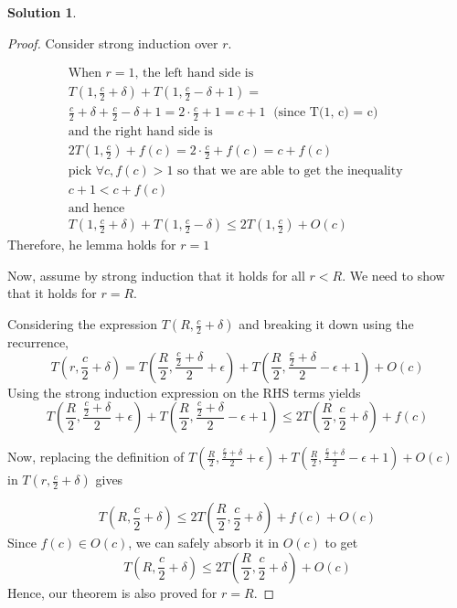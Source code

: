 \documentclass[12pt]{article}
\theoremstyle{definition}
\newtheorem*{solution}{Solution}
\begin{document}
\begin{solution}
\begin{proof}
Consider strong induction over $r$.


\begin{gather*}
\text{When $r = 1$, the left hand side is } \\
T \left(1, \frac{c}{2} + \delta\right) + T \left(1, \frac{c}{2} - \delta + 1 \right) =  \\
\frac{c}{2} + \delta + \frac{c}{2} - \delta + 1= 2 \cdot \frac{c}{2} + 1= c + 1 \; \text{ (since T(1, c) = c)} \\
\text{and the right hand side is} \\
2T \left(1, \frac{c}{2} \right) + f(c) = 2 \cdot \frac c 2 + f(c) = c + f(c) \\
\text{pick $\forall c, f(c) > 1$ so that we are able to get the inequality } \\
c + 1 < c + f(c) \\
\text{and hence} \\
T \left(1, \frac{c}{2} + \delta\right) + T \left(1, \frac{c}{2} - \delta \right) \leq 2T \left(1, \frac{c}{2} \right) + O(c)
\end{gather*}
Therefore, he lemma holds for $r = 1$


Now, assume by strong induction that it holds for all $r < R$. We need to show that it holds for $r = R$.

Considering the expression $T \left(R, \frac{c}{2} + \delta \right)$ and breaking it down using the recurrence, 
$$
T \left(r, \frac{c}{2} + \delta \right) = T\left(\frac{R}{2}, \frac{\frac{c}{2} + \delta}{2} + \epsilon \right) + T\left(\frac{R}{2}, \frac{\frac{c}{2} + \delta}{2} - \epsilon + 1 \right) + O(c)
$$
Using the strong induction expression on the RHS terms yields
\[
T\left(\frac{R}{2}, \frac{\frac{c}{2} + \delta}{2} + \epsilon \right) + 
T\left(\frac{R}{2}, \frac{\frac{c}{2} + \delta}{2} - \epsilon + 1 \right) \leq 2T\left(\frac{R}{2}, \frac{c}{2} + \delta \right) + f(c) \tag*{$f(c) \in O(c)$}
\]

Now, replacing the definition of
{\tiny
$ T\left(\frac{R}{2}, \frac{\frac{c}{2} + \delta}{2} + \epsilon \right) + T\left(\frac{R}{2}, \frac{\frac{c}{2} + \delta}{2} - \epsilon + 1 \right) + O(c) $
}
in
{\tiny $T \left(r, \frac{c}{2} + \delta \right)$ }
gives

$$
T \left(R, \frac{c}{2} + \delta \right)  \leq 2T\left(\frac{R}{2}, \frac{c}{2} + \delta \right) + f(c) + O(c)
$$
Since $f(c) \in O(c)$, we can safely absorb it in $O(c)$ to get
$$
T \left(R, \frac{c}{2} + \delta \right)  \leq 2T\left(\frac{R}{2}, \frac{c}{2} + \delta \right) + O(c)
$$
Hence, our theorem is also proved for $r = R$.
\end{proof}


\end{solution}
\end{document}
